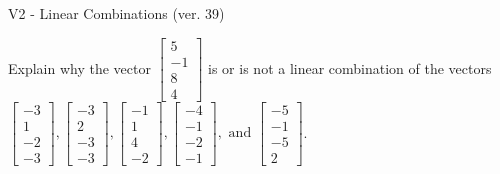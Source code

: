 \begin{exercise}
  \begin{exerciseTitle}V2 - Linear Combinations (ver. 39)\end{exerciseTitle}
  \begin{exerciseStatement}
    Explain why the vector \(\left[\begin{array}{c}
5 \\
-1 \\
8 \\
4
\end{array}\right]\)  is or is not a linear 
	combination of the vectors \(\left[\begin{array}{c}
-3 \\
1 \\
-2 \\
-3
\end{array}\right] , \left[\begin{array}{c}
-3 \\
2 \\
-3 \\
-3
\end{array}\right] , \left[\begin{array}{c}
-1 \\
1 \\
4 \\
-2
\end{array}\right] , \left[\begin{array}{c}
-4 \\
-1 \\
-2 \\
-1
\end{array}\right] , \text{ and } \left[\begin{array}{c}
-5 \\
-1 \\
-5 \\
2
\end{array}\right]\).
	



\end{exerciseStatement}
\end{exercise}
